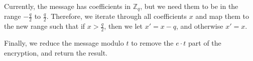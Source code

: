 \documentclass[../main.tex]{subfiles}
\begin{document}
Currently, the message has coefficients in $\mathbb{Z}_q$, but we need them to be in the range $-\frac{q}{2}$ to $\frac{q}{2}$.
Therefore, we iterate through all coefficients $x$ and map them to the new range such that if $x > \frac{q}{2}$, then we let $x' = x - q$, and otherwise $x' = x$.

Finally, we reduce the message modulo $t$ to remove the $e \cdot t$ part of the encryption, and return the result.
\end{document}
